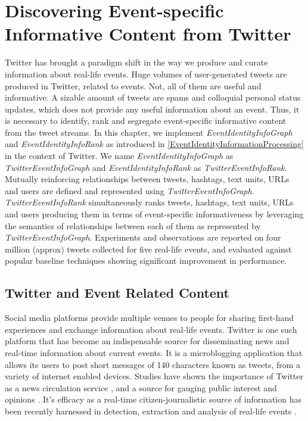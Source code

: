 
\chapter{Discovering Event-specific Informative Content from Twitter} %

\label{TwitterStudy} %


Twitter has brought a paradigm shift in the way we produce and curate information about real-life events. Huge volumes of user-generated tweets are produced in Twitter, related to events. Not, all of them are useful and informative. A sizable amount of tweets are spams and colloquial personal status updates, which does not provide any useful information about an event.  Thus, it is necessary to identify, rank and segregate event-specific informative content from the tweet streams. In this chapter, we implement \textit{EventIdentityInfoGraph} and \textit{EventIdentityInfoRank} as introduced in \ref{EventIdentityInformationProcessing} in the context of Twitter. We name \textit{EventIdentityInfoGraph} as \textit{TwitterEventInfoGraph} and \textit{EventIdentityInfoRank} as \textit{TwitterEventInfoRank}. Mutually reinforcing relationships between tweets, hashtags, text units, URLs and users are defined and represented using \textit{TwitterEventInfoGraph}. \textit{TwitterEventInfoRank} simultaneously ranks tweets, hashtags, text units, URLs and users producing them in terms of event-specific informativeness by leveraging the semantics of relationships between each of them as represented by \textit{TwitterEventInfoGraph}. Experiments and observations are reported on four million (approx) tweets collected for five real-life events, and evaluated against popular baseline techniques showing significant improvement in performance. 

\section{Twitter and Event Related Content}

\noindent Social media platforms provide multiple venues to people for sharing first-hand experiences and exchange information about real-life events. Twitter is one such platform that has become an indispensable source for disseminating news and real-time information about current events. It is a microblogging application that allows its users to post short messages of 140 characters known as tweets, from a variety of internet enabled devices. Studies have shown the importance of Twitter as a news circulation service \cite{phelan2009using}, and a source for gauging public interest and opinions \cite{o2010tweets}. It's efficacy as a real-time citizen-journalistic source of information has been recently harnessed in detection, extraction and analysis of real-life events \cite{sakaki2013tweet,popescu2011extracting,purohit2013twitris}.

